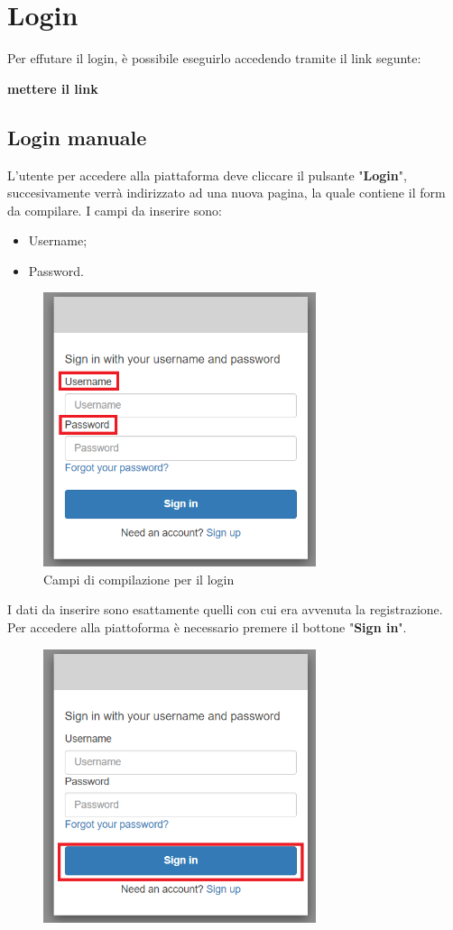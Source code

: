 \section{Login} {
    Per effutare il login, è possibile eseguirlo accedendo tramite il link segunte: 
    \begin{center}
        \textbf{mettere il link}
    \end{center}
    \subsection{Login manuale} {
        L'utente per accedere alla piattaforma deve cliccare il pulsante "\textbf{Login}", succesivamente verrà indirizzato ad una nuova pagina, 
        la quale contiene il form da compilare. I campi da inserire sono: 
        \begin{itemize}
            \item Username;
            \item Password.
        \end{itemize}
        \begin{figure}[H]
            \includegraphics[width=8cm]{sezioni/images/form-log.png}
            \centering
            \caption{Campi di compilazione per il login}
        \end{figure}
        I dati da inserire sono esattamente quelli con cui era avvenuta la registrazione. \aCapo
        Per accedere alla piattoforma è necessario premere il bottone "\textbf{Sign in}". 
        \begin{figure}[H]
            \includegraphics[width=8cm]{sezioni/images/conf-log.png}

\end{figure}}}
